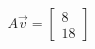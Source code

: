 \documentclass[preview]{standalone}
\begin{document}
\begin{align*}
A\vec{v} = \begin{bmatrix} 8 \\ 18 \end{bmatrix}
\end{align*}
\end{document}
